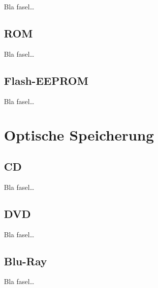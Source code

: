             Bla fasel\ldots
        
        \subsection{ROM}
        \label{ch:Technisch:sec:Elektronische Speicherung:sub:ROM}
        
            Bla fasel\ldots
            
        \subsection{Flash-EEPROM}
        \label{ch:Technisch:sec:Elektronische Speicherung:sub:Flash-EEPROM}
        
            Bla fasel\ldots
    
    \section{Optische Speicherung}
    \label{ch:Technisch:sec:Optische Speicherung}
        \subsection{CD}
        \label{ch:Technisch:sec:Optische Speicherung:sub:CD}
        
            Bla fasel\ldots
        
        \subsection{DVD}
        \label{ch:Technisch:sec:Optische Speicherung:sub:DVD}
        
            Bla fasel\ldots
        
        \subsection{Blu-Ray}
        \label{ch:Technisch:sec:Optische Speicherung:sub:Blu-Ray}
        
            Bla fasel\ldots

